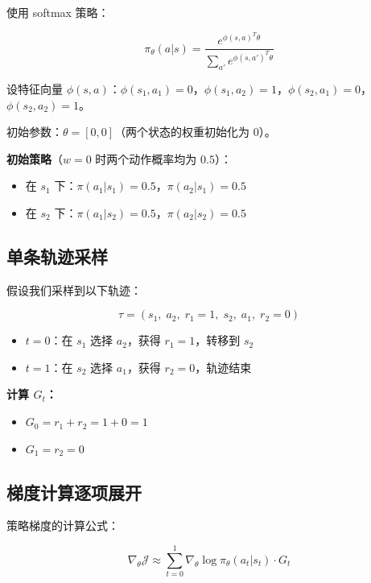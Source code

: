 \documentclass[12pt,a4paper]{article}
\newcommand{\grad}{\nabla}
\theoremstyle{noteplain}
\theoremstyle{noteexercise}
\begin{document}
使用 softmax 策略：

\begin{equation}\label{eq:softmax}
  \pi_\theta(a|s) = \frac{e^{\phi(s,a)^T \theta}}{\sum_{a'} e^{\phi(s,a')^T \theta}}
\end{equation}

设特征向量 $\phi(s,a)$：$\phi(s_1,a_1) = 0$，$\phi(s_1,a_2) = 1$，$\phi(s_2,a_1) = 0$，$\phi(s_2,a_2) = 1$。

初始参数：$\theta = [0, 0]$（两个状态的权重初始化为 $0$）。

\textbf{初始策略}（$w=0$ 时两个动作概率均为 $0.5$）：
\begin{itemize}
  \item 在 $s_1$ 下：$\pi(a_1|s_1) = 0.5$，$\pi(a_2|s_1) = 0.5$
  \item 在 $s_2$ 下：$\pi(a_1|s_2) = 0.5$，$\pi(a_2|s_2) = 0.5$
\end{itemize}

\subsection{单条轨迹采样}\label{ssec:sampled-trajectory}

假设我们采样到以下轨迹：

\begin{equation}\label{eq:tau-sample}
  \tau = (s_1,\; a_2,\; r_1=1,\; s_2,\; a_1,\; r_2=0)
\end{equation}

\begin{itemize}
  \setlength{\itemsep}{0.2em}
  \item $t=0$：在 $s_1$ 选择 $a_2$，获得 $r_1 = 1$，转移到 $s_2$
  \item $t=1$：在 $s_2$ 选择 $a_1$，获得 $r_2 = 0$，轨迹结束
\end{itemize}

\textbf{计算 $G_t$：}
\begin{itemize}
  \setlength{\itemsep}{0.2em}
  \item $G_0 = r_1 + r_2 = 1 + 0 = 1$
  \item $G_1 = r_2 = 0$
\end{itemize}

\subsection{梯度计算逐项展开}\label{ssec:gradient-compute}

策略梯度的计算公式：

\begin{equation}\label{eq:pg-sample}
  \grad_\theta \mathcal{J} \approx \sum_{t=0}^{1} \grad_\theta \log \pi_\theta(a_t|s_t) \cdot G_t
\end{equation}
\end{document}
